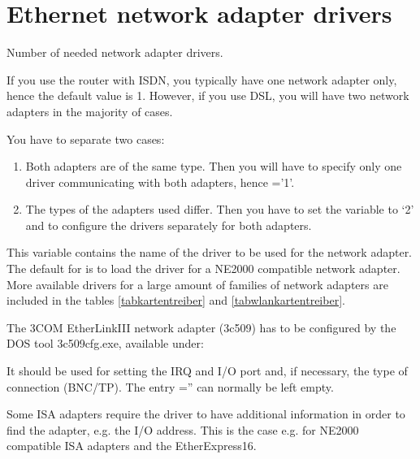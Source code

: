 
\section{Ethernet network adapter drivers}

\begin{description}

  {Number of needed network adapter drivers.

    If you use the router with ISDN, you typically have one network adapter
    only, hence the default value is 1. However, if you use DSL, you will
    have two network adapters in the majority of cases.

    You have to separate two cases:
    \begin{enumerate}
    \item Both adapters are of the same type. Then you will have to specify
      only one driver communicating with both adapters, hence
      ='1'.

    \item The types of the adapters used differ. Then you have to set the
      variable to `2' and to configure the drivers separately for both adapters.
    \end{enumerate}
    }



  {This variable contains the name of the driver to be used for the network
   adapter. The default for  is to load the driver for a NE2000
    compatible network adapter. More available drivers for a large amount of
    families of network adapters are included in the tables \ref{tabkartentreiber}
    and \ref{tabwlankartentreiber}.

    The 3COM EtherLinkIII network adapter (3c509) has to be configured by the
    DOS tool 3c509cfg.exe, available under:


    It should be used for setting the IRQ and I/O port and, if necessary, the
    type of connection (BNC/TP). The entry =''
    can normally be left empty.

    Some ISA adapters require the driver to have additional information in
    order to find the adapter, e.g. the I/O address. This is the case e.g. for
    NE2000 compatible ISA adapters and the EtherExpress16.

}
\end{description}
